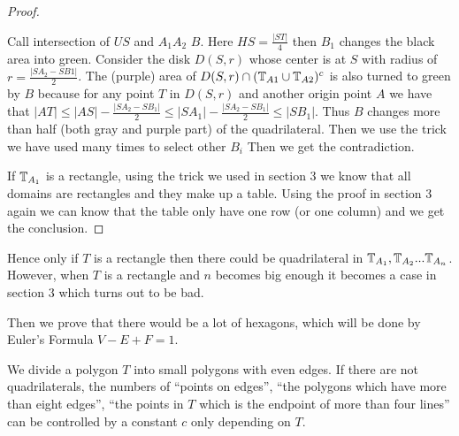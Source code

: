 \begin{proof}
\begin{center}
	\end{center}
	
	Call intersection of $US$ and $A_1A_2$ $B$. Here $HS = \frac{|ST|}{4}$ 
	then $B_1$ changes the black area into green. Consider the disk $D(S,r)$ 
	whose center is at $S$ with radius of $r = \frac{|SA_2-SB1|}{2}$. 
	The (purple) area of $D(S,r) \cap (\mathbb{T}_{A1} \cup \mathbb{T}_{A2})^c$ 
	is also turned to green by $B$ because for any point $T$ in $D(S,r)$ and
	another origin point $A$ we have that $|AT|\leq
	|AS|-\frac{|SA_2 - SB_1|}{2} \leq |SA_1| - \frac{|SA_2 - SB_1|}{2} 
	\leq |SB_1|$. Thus $B$ changes more than half (both gray and purple 
	part) of the quadrilateral. Then we use the trick we have used many 
	times to select other $B_i$ Then we get the contradiction.
	
	If $\mathbb{T}_{A_1}$ is a rectangle, using the trick we used in section 3 
	we know that all domains are rectangles and they make up a table. 
	Using the proof in section 3 again we can know that the table only 
	have one row (or one column) and we get the conclusion.
\end{proof}

Hence only if $T$ is a rectangle then there could be quadrilateral 
in $\mathbb{T}_{A_1}, \mathbb{T}_{A_2} ... \mathbb{T}_{A_n}$. However, when $T$ is a rectangle 
and $n$ becomes big enough it becomes a case in section 3 which turns 
out to be bad. 

Then we prove that there would be a lot of hexagons,
which will be done by Euler's Formula $V-E+F=1$.

\begin{thm}
	We divide a polygon $T$ into small polygons with even edges. 
	If there are not quadrilaterals, the numbers of ``points on edges'', 
	``the polygons which have more than eight edges'', ``the points in $T$ 
	which is the endpoint of more than four lines'' can be controlled 
	by a constant $c$ only depending on $T$.
\end{thm}

